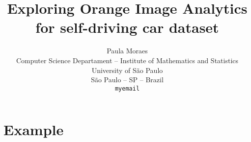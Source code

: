 \documentclass{article}
\title{Exploring Orange Image Analytics for self-driving car dataset}
\author{
  Paula Moraes \\
  Computer Science Departament -- Institute of Mathematics and Statistics\\
  University of São Paulo \\
  São Paulo -- SP -- Brazil \\
  \texttt{myemail} 
}
\begin{document}
\maketitle
\vspace{-1cm}

\section{Example}
\label{sec:intro}




\end{document}

